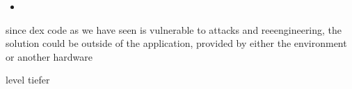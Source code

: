 \begin{itemize}
  \item
\end{itemize}
since dex code as we have seen is vulnerable to attacks and reeengineering, the solution could be outside of the application, provided by either the environment or another hardware


level tiefer
